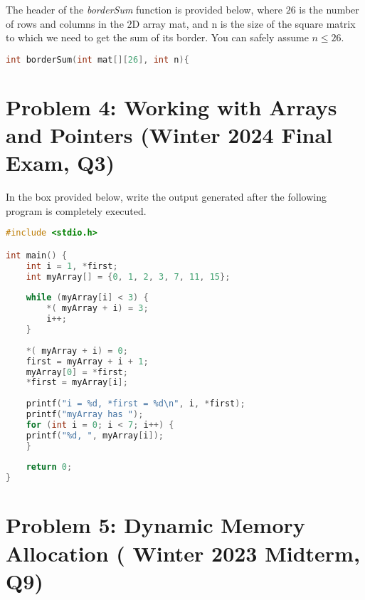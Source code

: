 \documentclass[12pt]{article}
\begin{document}
The header of the \textit{borderSum} function is provided below, where $26$ is the number of rows and columns in the $2$D array mat, and n is the size of the square matrix to which we need to get the sum of its border. You can safely assume $n \leq 26$.

\begin{lstlisting}[language=C]
int borderSum(int mat[][26], int n){
\end{lstlisting}
\iffalse
\textbf{Example solution:}
\begin{lstlisting}[language=C]
int borderSum(int mat[][26], int n) { 
	int sum = 0, row, col;
	
	if (n == 0) {
		return 0;
	} 	else if (n == 1) {
			sum = mat [0][0];
	} 	else if (n == 2) { //unnecessary else-if, but fine if it is there 
			sum = mat [0][0] + mat [0][1] + mat [1][0] + mat [1][1];
	} 	else {
			for (col = 0; col < n; col++) {
			sum += mat[0][col] + mat[n - 1][col]; 
			}
	
			for (row = 1; row < n - 1; row++) {
			sum += mat[row][0] + mat[row][n - 1];
		} 
	}
	return sum; 
}
\end{lstlisting}
\fi
\section*{Problem 4: Working with Arrays and Pointers (Winter 2024 Final Exam, Q3)}
In the box provided below, write the output generated after the following program is completely executed.

\begin{lstlisting}[language=C]
#include <stdio.h> 

int main() {
	int i = 1, *first;
	int myArray[] = {0, 1, 2, 3, 7, 11, 15};
	
	while (myArray[i] < 3) { 
		*( myArray + i) = 3; 
		i++;
	}
	
	*( myArray + i) = 0; 
	first = myArray + i + 1; 
	myArray[0] = *first; 
	*first = myArray[i];
	
	printf("i = %d, *first = %d\n", i, *first); 
	printf("myArray has ");
	for (int i = 0; i < 7; i++) {
	printf("%d, ", myArray[i]); 
	}
	
	return 0; 
}
\end{lstlisting}
\iffalse
\textbf{Example solution:}
\begin{lstlisting}[language=C]
i = 3, *first = 0
myArray has 7, 3, 3, 0, 0, 11, 15,
\end{lstlisting}
\fi
\section*{Problem 5:  Dynamic Memory Allocation ( Winter 2023 Midterm, Q9)}
\end{document}

